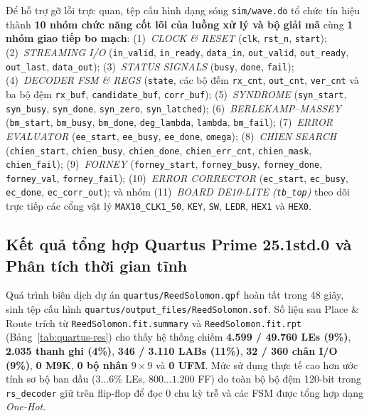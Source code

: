 \documentclass[11pt,a4paper]{report}
\begin{document}
{\sloppy
Để hỗ trợ gỡ lỗi trực quan, tệp cấu hình dạng sóng \texttt{sim/wave.do} tổ chức tín hiệu thành \textbf{10 nhóm chức năng cốt lõi của luồng xử lý và bộ giải mã} cùng \textbf{1 nhóm giao tiếp bo mạch}:
(1)~\textit{CLOCK \& RESET} (\texttt{clk}, \texttt{rst\_n}, \texttt{start});
(2)~\textit{STREAMING I/O} (\texttt{in\_valid}, \texttt{in\_ready}, \texttt{data\_in}, \texttt{out\_valid}, \texttt{out\_ready}, \texttt{out\_last}, \texttt{data\_out});
(3)~\textit{STATUS SIGNALS} (\texttt{busy}, \texttt{done}, \texttt{fail});
(4)~\textit{DECODER FSM \& REGS} (\texttt{state}, các bộ đếm \texttt{rx\_cnt}, \texttt{out\_cnt}, \texttt{ver\_cnt} và ba bộ đệm \texttt{rx\_buf}, \texttt{candidate\_buf}, \texttt{corr\_buf});
(5)~\textit{SYNDROME} (\texttt{syn\_start}, \texttt{syn\_busy}, \texttt{syn\_done}, \texttt{syn\_zero}, \texttt{syn\_latched});
(6)~\textit{BERLEKAMP--MASSEY} (\texttt{bm\_start}, \texttt{bm\_busy}, \texttt{bm\_done}, \texttt{deg\_lambda}, \texttt{lambda}, \texttt{bm\_fail});
(7)~\textit{ERROR EVALUATOR} (\texttt{ee\_start}, \texttt{ee\_busy}, \texttt{ee\_done}, \texttt{omega});
(8)~\textit{CHIEN SEARCH} (\texttt{chien\_start}, \texttt{chien\_busy}, \texttt{chien\_done}, \texttt{chien\_err\_cnt}, \texttt{chien\_mask}, \texttt{chien\_fail});
(9)~\textit{FORNEY} (\texttt{forney\_start}, \texttt{forney\_busy}, \texttt{forney\_done}, \texttt{forney\_val}, \texttt{forney\_fail});
(10)~\textit{ERROR CORRECTOR} (\texttt{ec\_start}, \texttt{ec\_busy}, \texttt{ec\_done}, \texttt{ec\_corr\_out});
và nhóm (11)~\textit{BOARD DE10-LITE (\texttt{tb\_top})} theo dõi trực tiếp các cổng vật lý \texttt{MAX10\_CLK1\_50}, \texttt{KEY}, \texttt{SW}, \texttt{LEDR}, \texttt{HEX1} và \texttt{HEX0}.
\par}

\subsection{Kết quả tổng hợp Quartus Prime 25.1std.0 và Phân tích thời gian tĩnh}
\label{subsec:quartus-sta}

Quá trình biên dịch dự án \texttt{quartus/ReedSolomon.qpf} hoàn tất trong 48 giây, sinh tệp cấu hình \texttt{quartus/\allowbreak output\_files/\allowbreak ReedSolomon.sof}. Số liệu sau Place \& Route trích từ \texttt{ReedSolomon.fit.\allowbreak summary} và \texttt{ReedSolomon.fit.rpt} (Bảng~\ref{tab:quartus-res}) cho thấy hệ thống chiếm \textbf{4.599 / 49.760 LEs (9\%)}, \textbf{2.035 thanh ghi (4\%)}, \textbf{346 / 3.110 LABs (11\%)}, \textbf{32 / 360 chân I/O (9\%)}, \textbf{0 M9K}, \textbf{0 bộ nhân $9\times 9$} và \textbf{0 UFM}. Mức sử dụng thực tế cao hơn ước tính sơ bộ ban đầu ($3\dots 6\%$ LEs, $800\dots 1.200$ FF) do toàn bộ bộ đệm 120-bit trong \texttt{rs\_decoder} giữ trên flip-flop để đọc 0 chu kỳ trễ và các FSM được tổng hợp dạng \textit{One-Hot}.
\end{document}

